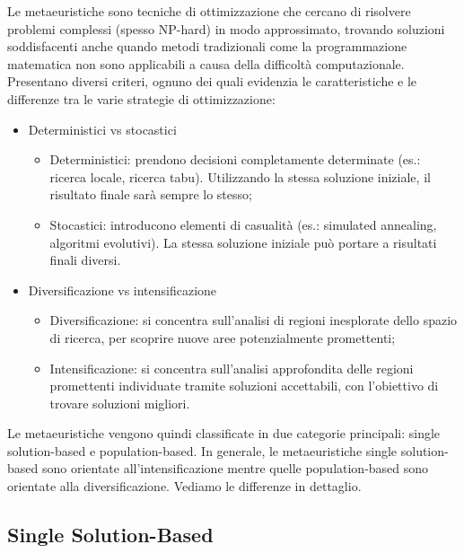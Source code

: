 Le metaeuristiche sono tecniche di ottimizzazione che cercano di risolvere problemi complessi (spesso NP-hard) in modo approssimato, trovando soluzioni soddisfacenti anche quando metodi tradizionali come la programmazione matematica non sono applicabili a causa della difficoltà computazionale. Presentano diversi criteri, ognuno dei quali evidenzia le caratteristiche e le differenze tra le varie strategie di ottimizzazione:
\begin{itemize}
    \item Deterministici vs stocastici
    \begin{itemize}
        \item Deterministici: prendono decisioni completamente determinate (es.: ricerca locale, ricerca tabu). Utilizzando la stessa soluzione iniziale, il risultato finale sarà sempre lo stesso;
        \item Stocastici: introducono elementi di casualità (es.: simulated annealing, algoritmi evolutivi). La stessa soluzione iniziale può portare a risultati finali diversi.
    \end{itemize}
     
    \item Diversificazione vs intensificazione
    \begin{itemize}
        \item Diversificazione: si concentra sull'analisi di regioni inesplorate dello spazio di ricerca, per scoprire nuove aree potenzialmente promettenti;
        \item Intensificazione: si concentra sull'analisi approfondita delle regioni promettenti individuate tramite soluzioni accettabili, con l'obiettivo di trovare soluzioni migliori.
    \end{itemize}
\end{itemize}

Le metaeuristiche vengono quindi classificate in due categorie principali: single solution-based e population-based. In generale, le metaeuristiche single solution-based sono orientate all'intensificazione mentre quelle population-based sono orientate alla diversificazione.
Vediamo le differenze in dettaglio.

\subsection{Single Solution-Based}

